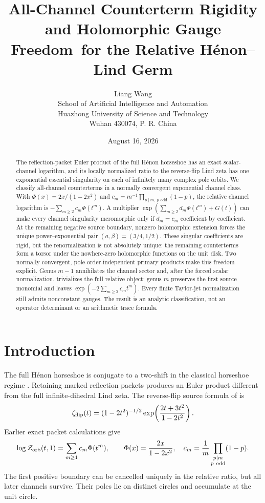 \documentclass[11pt]{article}
\title{All-Channel Counterterm Rigidity and Holomorphic Gauge Freedom\
for the Relative H\'enon--Lind Germ}
\author{Liang Wang\\\small School of Artificial Intelligence and Automation\\\small Huazhong University of Science and Technology\\\small Wuhan 430074, P. R. China}
\date{August 16, 2026}
\newcommand{\Zorb}{\mathcal Z_{\rm orb}}
\newcommand{\zflip}{\zeta_{\rm flip}}
\begin{document}
\maketitle

\begin{abstract}
The reflection-packet Euler product of the full H\'enon horseshoe has an exact
scalar-channel logarithm, and its locally normalized ratio to the reverse-flip
Lind zeta has one exponential essential singularity on each of infinitely many
complex pole orbits.  We classify all-channel counterterms in a normally
convergent exponential channel class.  With
\(\Phi(x)=2x/(1-2x^2)\) and
\(c_m=m^{-1}\prod_{p\mid m,\ p\text{ odd}}(1-p)\), the relative channel
logarithm is \(-\sum_{m\ge2}c_m\Phi(t^m)\).  A multiplier
\(\exp(\sum_{m\ge2}d_m\Phi(t^m)+G(t))\) can make every channel singularity
meromorphic only if \(d_m=c_m\) coefficient by coefficient.  At the remaining
negative source boundary, nonzero holomorphic extension forces the unique
power--exponential pair \((a,\beta)=(3/4,1/2)\).  These singular coefficients
are rigid, but the renormalization is not absolutely unique: the remaining
counterterms form a torsor under the nowhere-zero holomorphic functions on the
unit disk.  Two normally convergent, pole-order-independent primary products
make this freedom explicit.  Genus \(m-1\) annihilates the channel sector and,
after the forced scalar normalization, trivializes the full relative object;
genus \(m\) preserves the first source monomial and leaves
\(\exp(-2\sum_{m\ge2}c_mt^m)\).  Every finite Taylor-jet normalization still
admits nonconstant gauges.  The result is an analytic classification, not an
operator determinant or an arithmetic trace formula.
\end{abstract}

\section{Introduction}

The full H\'enon horseshoe is conjugate to a two-shift in the classical
horseshoe regime \cite{DevaneyNitecki1979}.  Retaining marked reflection
packets produces an Euler product different from the full infinite-dihedral
Lind zeta.  The reverse-flip source formula of \citet{KimLeePark2003} is
\begin{equation}\label{eq:lind-source}
 \zflip(t)=(1-2t^2)^{-1/2}
 \exp\!\left(\frac{2t+3t^2}{1-2t^2}\right).
\end{equation}
Earlier exact packet calculations give
\begin{equation}\label{eq:packet-source}
 \log\Zorb(t,1)=\sum_{m\ge1}c_m\Phi(t^m),\qquad
 \Phi(x)=\frac{2x}{1-2x^2},
 \quad
 c_m=\frac1m\prod_{\substack{p\mid m\\p\ \text{odd}}}(1-p).
\end{equation}
The first positive boundary can be cancelled uniquely in the relative ratio,
but all later channels survive.  Their poles lie on distinct circles and
accumulate at the unit circle.
\end{document}
